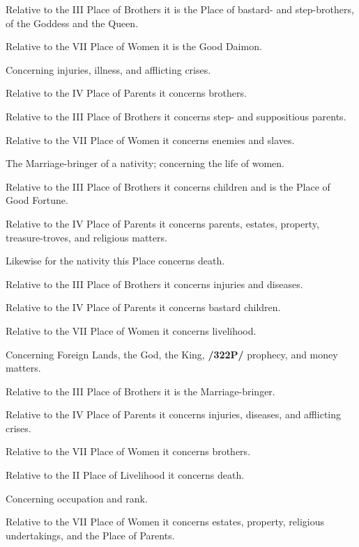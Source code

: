 \begin{description}[labelindent=0em , labelwidth=1em, labelsep=1em, leftmargin =!]
	Relative to the III Place of Brothers it is the Place of bastard- and step-brothers, of the Goddess and the Queen. 
	
	Relative to the VII Place of Women it is the Good Daimon.
	
\item[VI.] 
	Concerning injuries, illness, and afflicting crises. 
	
	Relative to the IV Place of Parents it concerns brothers. 
	
	Relative to the III Place of Brothers it concerns step- and suppositious parents. 
	
	Relative to the VII Place of Women it concerns enemies and slaves.

\item[VII.]
	 The Marriage-bringer of a nativity; concerning the life of women. 
	 
	 Relative to the III Place of Brothers it concerns children and is the Place of Good Fortune. 
	 
	 Relative to the IV Place of Parents it concerns parents, estates, property, treasure-troves, and religious matters.
	 
\item[VIII.]
	 Likewise for the nativity this Place concerns death. 
	 
	 Relative to the III Place of Brothers it concerns injuries and diseases. 
	 
	 Relative to the IV Place of Parents it concerns bastard children. 
	 
	 Relative to the VII Place of Women it concerns livelihood.
	 
\item[IX.]
	 Concerning Foreign Lands, the God, the King, \textbf{/322P/} prophecy, and money matters. 
	 
	 Relative to the III Place of Brothers it is the Marriage-bringer. 
	 
	 Relative to the IV Place of Parents it concerns injuries, diseases, and afflicting crises. 
	 
	 Relative to the VII Place of Women it concerns brothers. 
	 
	 Relative to the II Place of Livelihood it concerns death.
	 
\item[X.] 
	Concerning occupation and rank. 
	
	Relative to the VII Place of Women it concerns estates, property, religious undertakings, and the Place of Parents.
	

\end{description}
